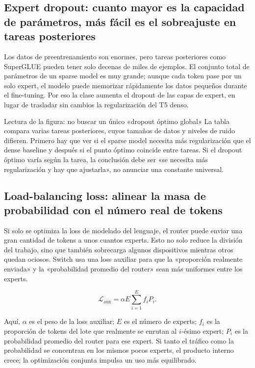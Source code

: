 \subsection{Expert dropout: cuanto mayor es la capacidad de parámetros, más fácil es el sobreajuste en tareas posteriores}

Los datos de preentrenamiento son enormes, pero tareas posteriores como SuperGLUE pueden tener solo decenas de miles de ejemplos. El conjunto total de parámetros de un sparse model es muy grande; aunque cada token pase por un solo expert, el modelo puede memorizar rápidamente los datos pequeños durante el fine-tuning. Por eso la clase aumenta el dropout de las capas de expert, en lugar de trasladar sin cambios la regularización del T5 denso.


\begin{knowledgebox}{Lectura de la figura: no buscar un único «dropout óptimo global»}
La tabla compara varias tareas posteriores, cuyos tamaños de datos y niveles de ruido difieren. Primero hay que ver si el sparse model necesita más regularización que el dense baseline y después si el punto óptimo coincide entre tareas. Si el dropout óptimo varía según la tarea, la conclusión debe ser «se necesita más regularización y hay que ajustarla», no anunciar una constante universal.
\end{knowledgebox}

\subsection{Load-balancing loss: alinear la masa de probabilidad con el número real de tokens}

Si solo se optimiza la loss de modelado del lenguaje, el router puede enviar una gran cantidad de tokens a unos cuantos experts. Esto no solo reduce la división del trabajo, sino que también sobrecarga algunos dispositivos mientras otros quedan ociosos. Switch usa una loss auxiliar para que la «proporción realmente enviada» y la «probabilidad promedio del router» sean más uniformes entre los experts.

\[
\mathcal{L}_{\text{aux}}=\alpha E\sum_{i=1}^{E} f_iP_i.
\]

Aquí, $\alpha$ es el peso de la loss auxiliar; $E$ es el número de experts; $f_i$ es la proporción de tokens del lote que realmente se enrutan al $i$-ésimo expert; $P_i$ es la probabilidad promedio del router para ese expert. Si tanto el tráfico como la probabilidad se concentran en los mismos pocos experts, el producto interno crece; la optimización conjunta impulsa un uso más equilibrado.

